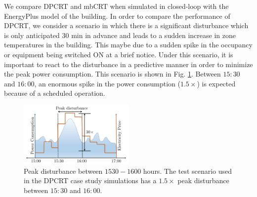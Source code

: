 We compare DPCRT and mbCRT when simulated in closed-loop with the EnergyPlus model of the building. In order to compare the performance of DPCRT, we consider a scenario in which there is a significant disturbance which is only anticipated $30$ min in advance and leads to a sudden increase in zone temperatures in the building. This maybe due to a sudden spike in the occupancy or equipment being switched ON at a brief notice. Under this scenario, it is important to react to the disturbance in a predictive manner in order to minimize the peak power consumption. This scenario is shown in Fig. \ref{F:scenario}. Between $15{:}30$ and $16{:}00$, an enormous spike in the power consumption ($1.5\times$) is expected because of a scheduled operation.
\begin{figure}
	\centering
	\hspace{1pt}
	\includegraphics[width=0.5\textwidth]{figs/peakpowerplot.pdf}
	\centering
	\caption{Peak disturbance between $1530-1600$ hours. The test scenario used in the DPCRT case study simulations has a $1.5\times$ peak disturbance between $15{:}30$ and $16{:}00$.}
	\label{F:scenario}
	\vspace{-10pt}
\end{figure}
